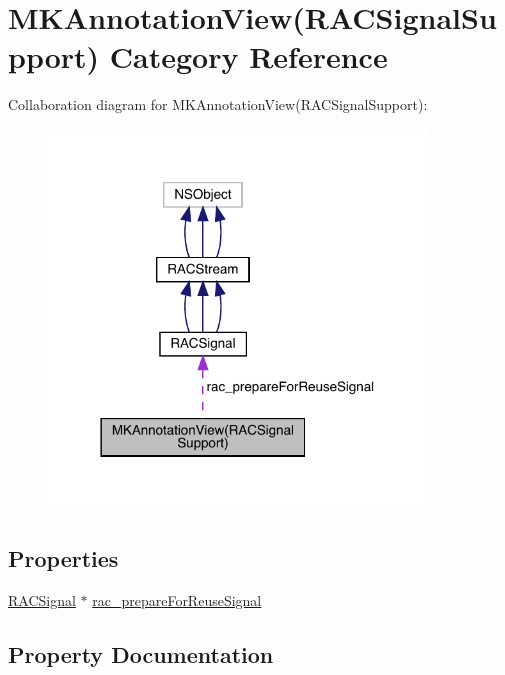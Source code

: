 \hypertarget{category_m_k_annotation_view_07_r_a_c_signal_support_08}{}\section{M\+K\+Annotation\+View(R\+A\+C\+Signal\+Support) Category Reference}
\label{category_m_k_annotation_view_07_r_a_c_signal_support_08}


Collaboration diagram for M\+K\+Annotation\+View(R\+A\+C\+Signal\+Support)\+:\nopagebreak
\begin{figure}[H]
\begin{center}
\leavevmode
\includegraphics[width=285pt]{category_m_k_annotation_view_07_r_a_c_signal_support_08__coll__graph}
\end{center}
\end{figure}
\subsection*{Properties}
\begin{DoxyCompactItemize}
\item 
\mbox{\hyperlink{interface_r_a_c_signal}{R\+A\+C\+Signal}} $\ast$ \mbox{\hyperlink{category_m_k_annotation_view_07_r_a_c_signal_support_08_ad400cdf226939a353dc457be75b7f563}{rac\+\_\+prepare\+For\+Reuse\+Signal}}
\end{DoxyCompactItemize}


\subsection{Property Documentation}
\mbox{\label{category_m_k_annotation_view_07_r_a_c_signal_support_08_ad400cdf226939a353dc457be75b7f563}} 
